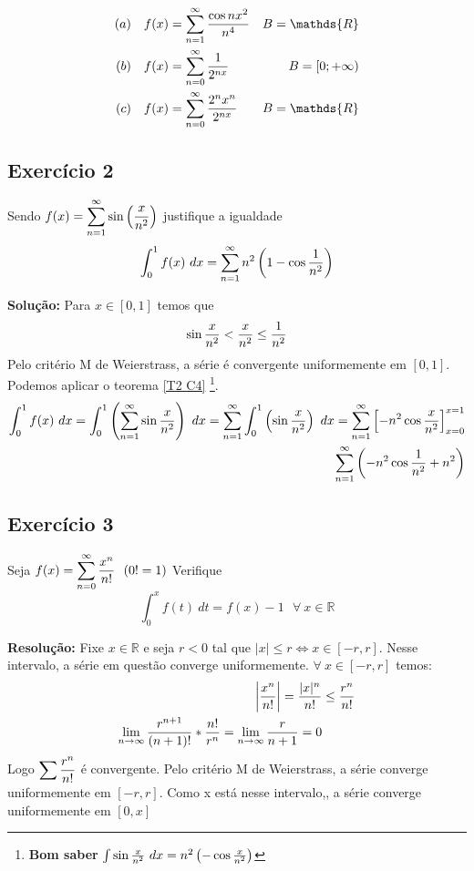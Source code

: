 \documentclass[12pt,openany]{book}
\newcommand{\LI}[1][n]{\lim_{{#1} \rightarrow \infty}}
\newcommand{\soma}[2][n]{\sum_{{#1} = #2}^\infty}
\newcommand{\E}[1]{Exercício #1}
\newcommand{\DS}{\displaystyle{}}
\begin{document}
\begin{align*}
(a) \ \ \ f(x) &= \soma{1} {\cos nx^2 \over n^4} & B = \mathds{R}\\
(b) \ \ \ f(x) &= \soma{0} {1 \over 2^{nx}} & B = [0; +\infty)\\
(c) \ \ \ f(x) &= \soma{0} {2^n x^n \over 2^{nx}} & B = \mathds{R} \\
\end{align*}

\subsection*{\E{2}}{Sendo $\displaystyle{f(x) = \soma{1} \sin \left( {x \over n^2}\right)}$ justifique a igualdade $$\int_0^1 f(x) \ dx = \soma{1} n^2 \left(1 -\cos {1 \over n^2}\right)$$

\textbf{Solução:} Para $x \in [0,1]$ temos que $$\sin {x \over n^2} < {x \over n^2} \leq {1 \over n^2}$$ Pelo critério M de Weierstrass, a série é convergente uniformemente em $[0,1]$. Podemos aplicar o teorema \ref{T2 C4} \footnote{\textbf{Bom saber} $\int \sin{x \over n^2}\ dx = n^2 \left(-\cos{x \over n^2}\right)$}. \begin{align*}
\int_0^1 f(x) \ dx = \int_0^1 \left( \soma{1} \sin {x \over n^2} \right) \ dx = \soma{1} \int_0^1 \left( \sin {x \over n^2} \right) \ dx = \soma{1} \left[ -n^2 \cos{x \over n^2} \right]_{x = 0}^{x = 1}\\
\soma{1} \left( -n^2\cos{1 \over n^2} +n^2 \right)
\end{align*}

\subsection*{\E{3}}{Seja $\displaystyle{f(x) = \soma{0}  {x^n \over n!} \ \ (0! = 1)}$ Verifique $$\int_0^x f(t) \ dt = f(x) -1 \ \ \ \forall \ x \in \mathds{R}$$}

\textbf{Resolução:} Fixe $x \in \mathds{R}$ e seja $r < 0$ tal que $|x| \leq r \Longleftrightarrow x \in [-r,r]$. Nesse intervalo, a série em questão converge uniformemente. $\forall \ x \in [-r, r]$ temos: \begin{align*}
\left| \frac{x^n}{n!} \right| = {|x|^n \over n!} &\leq {r^n \over n!} \\
\LI {r^{n+1} \over (n+1)!}*{n! \over r^n} = \LI {r \over n+1} = 0
\end{align*} 
Logo $\DS{\sum {r^n \over n!}}$ é convergente. Pelo critério M de Weierstrass, a série converge uniformemente em $[-r,r]$. Como x está nesse  intervalo,, a série converge uniformemente em $[0,x]$

}
\end{document}
